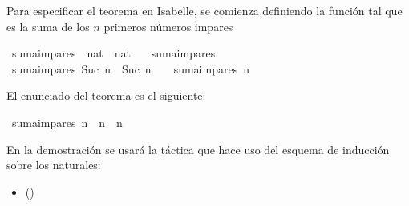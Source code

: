 \begin{isabellebody}
\begin{isamarkuptext}
  Para especificar el teorema en Isabelle, se comienza definiendo 
  la función  tal que  es
  la suma de los $n$ primeros números impares%
\end{isamarkuptext}\isamarkuptrue%
\isamarkupfalse%
\ suma{\isacharunderscore}impares\ {\isacharcolon}{\isacharcolon}\ {\isachardoublequoteopen}nat\ {\isasymRightarrow}\ nat{\isachardoublequoteclose}\ \isanewline
\ \ {\isachardoublequoteopen}suma{\isacharunderscore}impares\ {}\ {\isacharequal}\ {}{\isachardoublequoteclose}\ \isanewline
{\isacharbar}\ {\isachardoublequoteopen}suma{\isacharunderscore}impares\ {\isacharparenleft}Suc\ n{\isacharparenright}\ {\isacharequal}\ {\isacharparenleft}{}{\isacharasterisk}{\isacharparenleft}Suc\ n{\isacharparenright}\ {\isacharminus}\ {}{\isacharparenright}\ {\isacharplus}\ suma{\isacharunderscore}impares\ n{\isachardoublequoteclose}%
\begin{isamarkuptext}%
El enunciado del teorema es el siguiente:%
\end{isamarkuptext}\isamarkuptrue%
\isamarkupfalse%
\ {\isachardoublequoteopen}suma{\isacharunderscore}impares\ n\ {\isacharequal}\ n\ {\isacharasterisk}\ n{\isachardoublequoteclose}\isanewline
%
\isadelimproof
%
\endisadelimproof
%
\isatagproof
{}\isamarkupfalse%
%
\endisatagproof
{\isafoldproof}%
%
\isadelimproof
%
\endisadelimproof
%
\begin{isamarkuptext}%
En la demostración se usará la táctica  que hace
  uso del esquema de inducción sobre los naturales:
  \begin{itemize}
  \item[]  
          \hfill ()
  \end{itemize}


\end{isamarkuptext}
\end{isabellebody}
